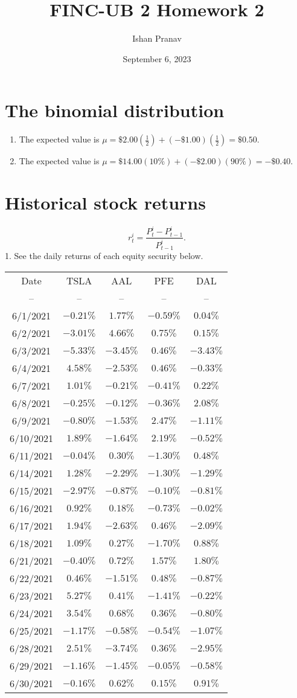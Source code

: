 \documentclass[12pt]{article}
\title{FINC-UB 2 Homework 2}
\author{Ishan Pranav}
\date{September 6, 2023}
\begin{document}
\maketitle
\section{The binomial distribution}
\begin{enumerate}
    \item The expected value is $\mu=\$2.00\left(\frac{1}{2}\right)+(-\$1.00)\left(\frac{1}{2}\right)=\$0.50$.
    \item The expected value is $\mu=\$14.00(10\%)+(-\$2.00)(90\%)=-\$0.40$.
\end{enumerate}
\section{Historical stock returns}
\[r_t^i=\frac{P_t^i-P_{t-1}^i}{P_{t-1}^i}.\]
1. See the daily returns of each equity security below.
\begin{center}
\begin{tabular}{c|c|c|c|c}
Date&TSLA&AAL&PFE&DAL\\
--&--&--&--&--\\
6/1/2021&$-0.21\%$&$1.77\%$&$-0.59\%$&$0.04\%$\\
6/2/2021&$-3.01\%$&$4.66\%$&$0.75\%$&$0.15\%$\\
6/3/2021&$-5.33\%$&$-3.45\%$&$0.46\%$&$-3.43\%$\\
6/4/2021&$4.58\%$&$-2.53\%$&$0.46\%$&$-0.33\%$\\
6/7/2021&$1.01\%$&$-0.21\%$&$-0.41\%$&$0.22\%$\\
6/8/2021&$-0.25\%$&$-0.12\%$&$-0.36\%$&$2.08\%$\\
6/9/2021&$-0.80\%$&$-1.53\%$&$2.47\%$&$-1.11\%$\\
6/10/2021&$1.89\%$&$-1.64\%$&$2.19\%$&$-0.52\%$\\
6/11/2021&$-0.04\%$&$0.30\%$&$-1.30\%$&$0.48\%$\\
6/14/2021&$1.28\%$&$-2.29\%$&$-1.30\%$&$-1.29\%$\\
6/15/2021&$-2.97\%$&$-0.87\%$&$-0.10\%$&$-0.81\%$\\
6/16/2021&$0.92\%$&$0.18\%$&$-0.73\%$&$-0.02\%$\\
6/17/2021&$1.94\%$&$-2.63\%$&$0.46\%$&$-2.09\%$\\
6/18/2021&$1.09\%$&$0.27\%$&$-1.70\%$&$0.88\%$\\
6/21/2021&$-0.40\%$&$0.72\%$&$1.57\%$&$1.80\%$\\
6/22/2021&$0.46\%$&$-1.51\%$&$0.48\%$&$-0.87\%$\\
6/23/2021&$5.27\%$&$0.41\%$&$-1.41\%$&$-0.22\%$\\
6/24/2021&$3.54\%$&$0.68\%$&$0.36\%$&$-0.80\%$\\
6/25/2021&$-1.17\%$&$-0.58\%$&$-0.54\%$&$-1.07\%$\\
6/28/2021&$2.51\%$&$-3.74\%$&$0.36\%$&$-2.95\%$\\
6/29/2021&$-1.16\%$&$-1.45\%$&$-0.05\%$&$-0.58\%$\\
6/30/2021&$-0.16\%$&$0.62\%$&$0.15\%$&$0.91\%$\\
\end{tabular}
\end{center}
\end{document}
